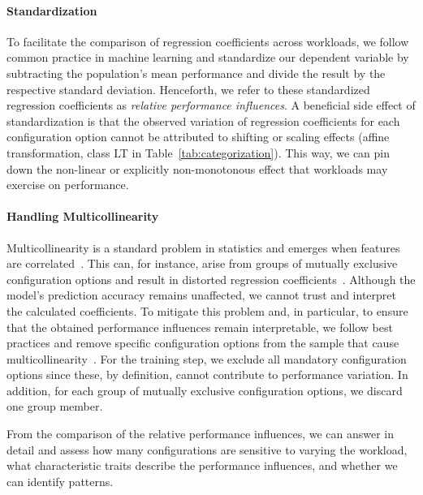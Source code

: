 {\paragraph*{Standardization}
To facilitate the comparison of regression coefficients across workloads, we follow common practice in machine learning and standardize our dependent variable by subtracting the population’s mean performance and divide the result by the respective standard deviation. Henceforth, we refer to these standardized regression coefficients as \textit{relative performance influences}. A beneficial side effect of standardization is that the observed variation of regression coefficients for each configuration option cannot be attributed to shifting or scaling effects (affine transformation, class \colorbox{lt-color}{\textsf{LT}} in Table~\ref{tab:categorization}). This way, we can pin down  the non-linear or explicitly non-monotonous effect that workloads may exercise on performance.
\paragraph*{Handling Multicollinearity} Multicollinearity is a standard problem in statistics and emerges when features are correlated~\cite{Daoud_2017}. This can, for instance, arise from groups of mutually exclusive configuration options and result in distorted regression coefficients~\cite{dorn2020}. Although the model's prediction accuracy remains unaffected, we cannot trust and interpret the calculated coefficients. To mitigate this problem and, in particular, to ensure that the obtained performance influences remain interpretable, we follow best practices and remove specific configuration options from the sample that cause multicollinearity~\cite{dorn2020}. For the training step, we exclude all mandatory configuration options since these, by definition, cannot contribute to performance variation. In addition, for each group of mutually exclusive configuration options, we discard one group member. 

From the comparison of the relative performance influences, we can answer  in detail and assess how many configurations are sensitive to varying the workload, what characteristic traits describe the performance influences, and whether we can identify patterns.
}
